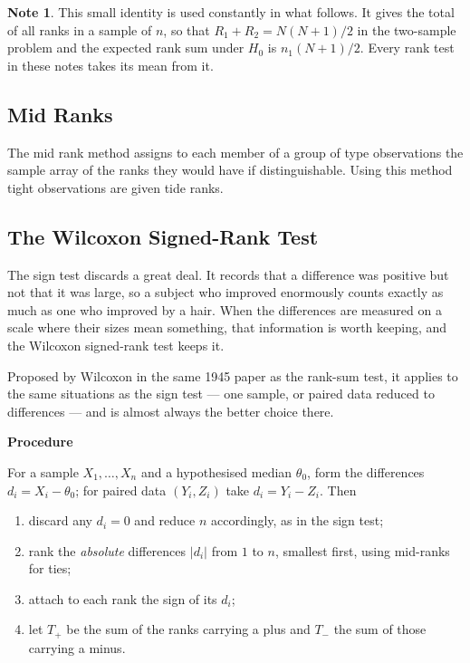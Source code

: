 \documentclass[11pt,a4paper]{article}
\theoremstyle{definition}
\newtheorem{note}[thm]{Note}
\begin{document}
\begin{note}
This small identity is used constantly in what follows. It gives the total of all
ranks in a sample of $n$, so that $R_1+R_2=N(N+1)/2$ in the two-sample problem and
the expected rank sum under $H_0$ is $n_1(N+1)/2$. Every rank test in these notes
takes its mean from it.
\end{note}















\pagebreak
\subsection{Mid Ranks}
The mid rank method assigns to each member of a group of type observations the sample array of the ranks they would have if distinguishable. Using this method tight observations are given tide ranks.\\





\subsection{The Wilcoxon Signed-Rank Test}
The sign test discards a great deal. It records that a difference was positive but
not that it was large, so a subject who improved enormously counts exactly as much
as one who improved by a hair. When the differences are measured on a scale where
their sizes mean something, that information is worth keeping, and the Wilcoxon
signed-rank test keeps it.

Proposed by Wilcoxon in the same 1945 paper as the rank-sum test, it applies to the
same situations as the sign test --- one sample, or paired data reduced to
differences --- and is almost always the better choice there.

\begin{center}
\textbf{Procedure}
\end{center}

For a sample $X_1,\dots,X_n$ and a hypothesised median $\theta_0$, form the
differences $d_i=X_i-\theta_0$; for paired data $\left(Y_i,Z_i\right)$ take
$d_i=Y_i-Z_i$. Then
\begin{enumerate}
\item[(i).] discard any $d_i=0$ and reduce $n$ accordingly, as in the sign test;
\item[(ii).] rank the \emph{absolute} differences $\left|d_i\right|$ from $1$ to
$n$, smallest first, using mid-ranks for ties;
\item[(iii).] attach to each rank the sign of its $d_i$;
\item[(iv).] let $T_{+}$ be the sum of the ranks carrying a plus and $T_{-}$ the
sum of those carrying a minus.
\end{enumerate}
\end{document}
